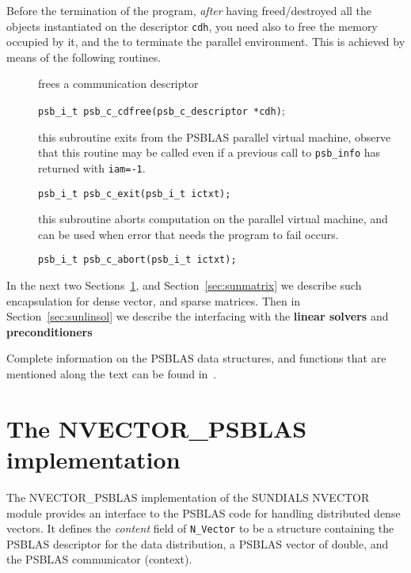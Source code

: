 \documentclass[twoside,a4paper]{refart}
\theoremstyle{definition}
\begin{document}
	Before the termination of the program, \textit{after} having freed/destroyed all the objects instantiated on the descriptor \texttt{cdh}, you need also to free the memory occupied by it, and the to terminate the parallel environment. This is achieved by means of the following routines.
	\begin{description}
		\item[] frees a communication descriptor
		
		 \lstinline[style=CStyle]|psb_i_t psb_c_cdfree(psb_c_descriptor *cdh)|;
		
		\item[] this subroutine exits from the PSBLAS parallel virtual machine, observe that this routine may be called even if a previous call to \lstinline[style=CStyle]|psb_info| has returned with \lstinline[style=CStyle]|iam=-1|.
		
		 \lstinline[style=CStyle]|psb_i_t psb_c_exit(psb_i_t ictxt);|
		
		\item[] this subroutine aborts computation on the parallel virtual machine, and can be used when error that needs the program to fail occurs.
		
		 \lstinline[style=CStyle]|psb_i_t psb_c_abort(psb_i_t ictxt);| 		
		
	\end{description}


	
	In the next two Sections~\ref{sec:nvector}, and Section~\ref{sec:sunmatrix} we describe such encapsulation for dense vector, and sparse matrices. Then in Section~\ref{sec:sunlinsol} we describe the interfacing with the \textbf{linear solvers} and \textbf{preconditioners}

	Complete information on the PSBLAS data structures, and functions that are mentioned along the text can be found in~\cite{psblasguide}.
	
	
	\section{The NVECTOR\_PSBLAS implementation}\label{sec:nvector}
	The NVECTOR\_PSBLAS implementation of the SUNDIALS NVECTOR module provides an interface to the PSBLAS code for handling distributed dense vectors.
	It defines the \emph{content} field of \texttt{N\_Vector} to be a structure containing the PSBLAS descriptor for the data distribution, a PSBLAS vector of double, and the PSBLAS communicator (context).
	
\end{document}
